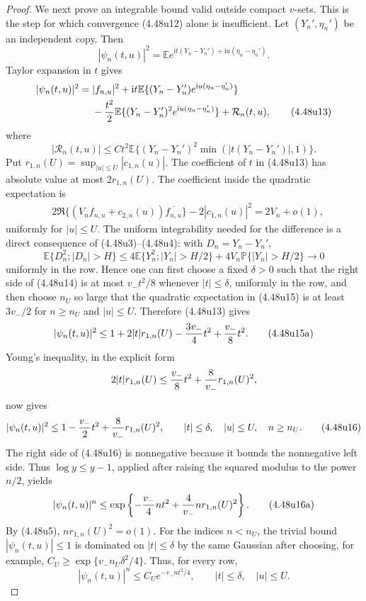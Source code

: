 \documentclass[11pt,a4paper]{article}
\numberwithin{equation}{section}
\theoremstyle{definition}
\theoremstyle{remark}
\newcommand{\E}{\mathbb E}
\newcommand{\Pp}{\mathbb P}
\newcommand{\ii}{\mathrm i}
\begin{document}
\begin{proof}
We next prove an integrable bound valid outside compact $v$-sets.  This is
the step for which convergence (4.48u12) alone is insufficient.  Let
$(Y_n',\eta_n')$ be an independent copy.  Then
\[
 |\psi_n(t,u)|^2
 =\E e^{\ii t(Y_n-Y_n')+\ii u(\eta_n-\eta_n')}.
\]
Taylor expansion in $t$ gives
\begin{align*}
 |\psi_n(t,u)|^2
 ={}&|f_{n,u}|^2
 +\ii t\E\{(Y_n-Y_n')e^{\ii u(\eta_n-\eta_n')}\}\\
 &-{t^2\over2}\E\{(Y_n-Y_n')^2
                e^{\ii u(\eta_n-\eta_n')}\}+\mathcal R_n(t,u),
                                                               \tag{4.48u13}
\end{align*}
where
\[
 |\mathcal R_n(t,u)|
 \le Ct^2\E\{(Y_n-Y_n')^2
                    \min(|t(Y_n-Y_n')|,1)\}.          \tag{4.48u14}
\]
Put $r_{1,n}(U)=\sup_{|u|\le U}|c_{1,n}(u)|$.  The coefficient of $t$ in
(4.48u13) has absolute value at most $2r_{1,n}(U)$.  The coefficient inside
the quadratic expectation is
\begin{align*}
 &2\Re\{(V_nf_{n,u}+c_{2,n}(u))\overline{f_{n,u}}\}
       -2|c_{1,n}(u)|^2
   =2V_n+o(1),                                        \tag{4.48u15}
\end{align*}
uniformly for $|u|\le U$.  The uniform integrability needed for the
difference is a direct consequence of (4.48u3)--(4.48u4): with
$D_n=Y_n-Y_n'$,
\[
 \E\{D_n^2;|D_n|>H\}
 \le4\E\{Y_n^2;|Y_n|>H/2\}
      +4V_n\Pp\{|Y_n|>H/2\}\longrightarrow0           \tag{4.48u15b}
\]
uniformly in the row.  Hence one can first choose a fixed
$\delta>0$ such that the right side of (4.48u14) is at most
$v_-t^2/8$ whenever $|t|\le\delta$, uniformly in the row, and then choose
$n_U$ so large that the quadratic expectation in (4.48u15) is at least
$3v_-/2$ for $n\ge n_U$ and $|u|\le U$.  Therefore (4.48u13) gives
\[
 |\psi_n(t,u)|^2
 \le1+2|t|r_{1,n}(U)-{3v_-\over4}t^2+{v_-\over8}t^2.
                                                               \tag{4.48u15a}
\]
Young's inequality, in the explicit form
\[
 2|t|r_{1,n}(U)\le {v_-\over8}t^2+{8\over v_-}r_{1,n}(U)^2,
\]
now gives
\[
 |\psi_n(t,u)|^2
 \le1-{v_-\over2}t^2+{8\over v_-}r_{1,n}(U)^2,
 \qquad |t|\le\delta,\quad |u|\le U,\quad n\ge n_U.  \tag{4.48u16}
\]
The right side of (4.48u16) is nonnegative because it bounds the
nonnegative left side.  Thus $\log y\le y-1$, applied after raising the
squared modulus to the power $n/2$, yields
\[
 |\psi_n(t,u)|^n
 \le\exp\left\{-{v_-\over4}nt^2+{4\over v_-}n
                         r_{1,n}(U)^2\right\}.         \tag{4.48u16a}
\]
By (4.48u5), $nr_{1,n}(U)^2=o(1)$.  For the indices $n<n_U$, the trivial
bound $|\psi_n(t,u)|\le1$ is dominated on $|t|\le\delta$ by the same
Gaussian after choosing, for example,
$C_U\ge\exp\{v_-n_U\delta^2/4\}$.  Thus, for every row,
\[
 |\psi_n(t,u)|^n\le C_Ue^{-v_-nt^2/4},
 \qquad |t|\le\delta,\quad |u|\le U.                 \tag{4.48u17}
\]


\end{proof}
\end{document}
